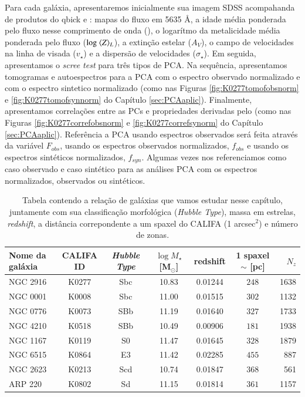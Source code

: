 Para cada galáxia, apresentaremos inicialmente sua imagem SDSS acompahanda de produtos do {\sc qbick} e \pycasso: mapas
do fluxo em 5635 \AA, a idade média ponderada pelo fluxo nesse comprimento de onda (), o logarítmo da
metalicidade média ponderada pelo fluxo ($\log\ \meanL{Z}$), a extinção estelar ($A_V$), o campo de velocidades na linha
de visada ($v_\star$) e a dispersão de velocidades ($\sigma_\star$). Em seguida, apresentamos o {\em scree test} para
três tipos de PCA. Na sequência, apresentamos tomogramas e autoespectros para a PCA com o espectro observado normalizado
e com o espectro sintetico normalizado (como nas Figuras \ref{fig:K0277tomofobsnorm} e \ref{fig:K0277tomofsynnorm} do
Capítulo \ref{sec:PCAaplic}). Finalmente, apresentamos correlações entre as PCs e propriedades derivadas pelo \starlight
(como nas Figuras \ref{fig:K0277correfobsnorm} e \ref{fig:K0277correfsynorm} do Capítulo \ref{sec:PCAaplic}).
Referência a PCA usando espectros observados será feita através da variável $F_{obs}$, usando os espectros observados
normalizados, $f_{obs}$ e usando os espectros sintéticos normalizados, $f_{syn}$. Algumas vezes nos referenciamos como
caso observado e caso sintético para as análises PCA com os espectros normalizados, observados ou sintéticos.

\begin{table}
	\caption[Relação de galáxias do CALIFA usadas neste trabalho.]
	{Tabela contendo a relação de galáxias que vamos estudar nesse capítulo, juntamente com sua classificação morfológica
	({\em Hubble Type}), massa em estrelas, {\em redshift}, a distância correpondente a um spaxel do CALIFA
	(1 arcsec$^2$) e número de zonas.}
	\begin{tabular}{l c c c c c r}
		Nome da galáxia & CALIFA ID & {\em Hubble Type} & $\log M_\star$ [M$_\odot$] & redshift & 1 spaxel $\sim$ [pc] &
		$N_z$ \\
		\midrule
		NGC 2916 & K0277 & Sbc & 10.83 & 0.01244 & $248$ & 1638 \\
		NGC 0001 & K0008 & Sbc & 11.00 & 0.01515 & $302$ & 1132 \\
		NGC 0776 & K0073 & SBb & 11.19 & 0.01640 & $327$ & 1733 \\
		NGC 4210 & K0518 & SBb & 10.49 & 0.00906 & $181$ & 1938 \\
		NGC 1167 & K0119 & S0  & 11.47 & 0.01645 & $328$ & 1879 \\
		NGC 6515 & K0864 & E3  & 11.42 & 0.02285 & $455$ & 887  \\
		NGC 2623 & K0213 & Scd & 10.74 & 0.01847 & $368$ & 561  \\
		ARP 220  & K0802 & Sd  & 11.15 & 0.01814 & $361$ & 1157 \\
	\end{tabular}
	\label{tab:amostraGalaxias}
\end{table}

